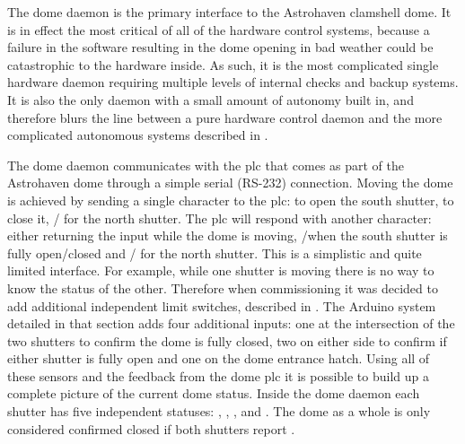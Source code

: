 \begin{colsection}
\begin{colsection}
The dome daemon is the primary interface to the Astrohaven clamshell dome. It is in effect the most critical of all of the hardware control systems, because a failure in the software resulting in the dome opening in bad weather could be catastrophic to the hardware inside. As such, it is the most complicated single hardware daemon requiring multiple levels of internal checks and backup systems. It is also the only daemon with a small amount of autonomy built in, and therefore blurs the line between a pure hardware control daemon and the more complicated autonomous systems described in .

The dome daemon communicates with the \gls{plc} that comes as part of the Astrohaven dome through a simple serial (RS-232) connection. Moving the dome is achieved by sending a single character to the \gls{plc}:  to open the south shutter,  to close it, / for the north shutter. The \gls{plc} will respond with another character: either returning the input while the dome is moving, /when the south shutter is fully open/closed and / for the north shutter. This is a simplistic and quite limited interface. For example, while one shutter is moving there is no way to know the status of the other. Therefore when commissioning it was decided to add additional independent limit switches, described in . The Arduino system detailed in that section adds four additional inputs: one at the intersection of the two shutters to confirm the dome is fully closed, two on either side to confirm if either shutter is fully open and one on the dome entrance hatch. Using all of these sensors and the feedback from the dome \gls{plc} it is possible to build up a complete picture of the current dome status. Inside the dome daemon each shutter has five independent statuses: , , ,  and . The dome as a whole is only considered confirmed closed if both shutters report .


\end{colsection}
\end{colsection}
